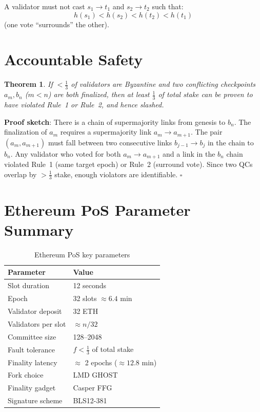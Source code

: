 \documentclass[12pt,a4paper,openany]{book}
\theoremstyle{definition}
\theoremstyle{plain}
\newtheorem{theorem}{Theorem}[chapter]
\theoremstyle{remark}
\begin{document}
A validator must not cast $s_1\to t_1$ and $s_2\to t_2$ such that:
\[
  h(s_1) < h(s_2) < h(t_2) < h(t_1)
\]
(one vote ``surrounds'' the other).

\section{Accountable Safety}

\begin{theorem}
  If $<\frac{1}{3}$ of validators are Byzantine and two conflicting
  checkpoints $a_m,b_n$ ($m<n$) are both finalized, then at least
  $\frac{1}{3}$ of total stake can be proven to have violated Rule~1
  or Rule~2, and hence slashed.
\end{theorem}

\textbf{Proof sketch}: There is a chain of supermajority links from
genesis to $b_n$.  The finalization of $a_m$ requires a supermajority
link $a_m\to a_{m+1}$.  The pair $(a_m,a_{m+1})$ must fall between two
consecutive links $b_{j-1}\to b_j$ in the chain to $b_n$.  Any
validator who voted for both $a_m\to a_{m+1}$ and a link in the $b_n$
chain violated Rule~1 (same target epoch) or Rule~2 (surround vote).
Since two QCs overlap by $>\frac{1}{3}$ stake, enough violators are
identifiable.  $\square$

\section{Ethereum PoS Parameter Summary}

\begin{table}[h]
\centering
\caption{Ethereum PoS key parameters}
\begin{tabular}{ll}
\toprule
\textbf{Parameter} & \textbf{Value} \\
\midrule
Slot duration          & 12 seconds \\
Epoch                  & 32 slots $\approx 6.4$ min \\
Validator deposit      & 32 ETH \\
Validators per slot    & $\approx n/32$ \\
Committee size         & 128--2048 \\
Fault tolerance        & $f<\frac{1}{3}$ of total stake \\
Finality latency       & $\approx$ 2 epochs ($\approx 12.8$ min) \\
Fork choice            & LMD GHOST \\
Finality gadget        & Casper FFG \\
Signature scheme       & BLS12-381 \\
\bottomrule
\end{tabular}
\end{table}
\end{document}
